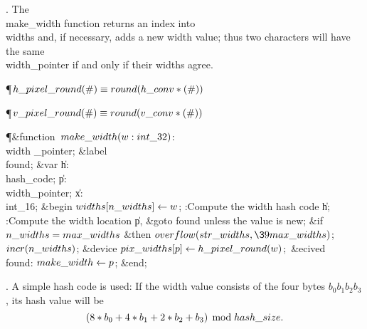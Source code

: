 . The \\{make\_width} function returns an index into \\{widths} and, if
necessary, adds a new width value; thus two characters will have the
same \\{width\_pointer} if and only if their widths agree.

\Y\P\D {}$\\{h\_pixel\_round}(\#)\S\\{round}(\\{h\_conv}\ast(\#))$\par
\P\D {}$\\{v\_pixel\_round}(\#)\S\\{round}(\\{v\_conv}\ast(\#))$\par
\Y\P\4\&{function}\1\  $\\{make\_width}(\|w:\\{int\_32})$: \\{width%
\_pointer};\6
\4\&{label} \\{found};\6
\4\&{var} \|h: \\{hash\_code};\6
\|p: \\{width\_pointer};\6
\|x: \\{int\_16};\2\6
\&{begin} $\\{widths}[\\{n\_widths}]\K\|w$;\5
:Compute the width hash code \|h\X;\6
:Compute the width location \|p, \&{goto}  found unless the value is new\X;%
\6
\&{if} $\\{n\_widths}=\\{max\_widths}$ \1\&{then}\5
$\\{overflow}(\\{str\_widths},\39\\{max\_widths})$;\2\6
$\\{incr}(\\{n\_widths})$;\6
\&{device} $\\{pix\_widths}[\|p]\K\\{h\_pixel\_round}(\|w)$;\ \&{ecived}\6
\4\\{found}: $\\{make\_width}\K\|p$;\6
\&{end};\par
\fi

. A simple hash code is used: If the width value consists of the four
bytes $b_0b_1b_2b_3$, its hash value will be
$$(8*b_0+4*b_1+2*b_2+b_3)\,\bmod\,\\{hash\_size}.$$

